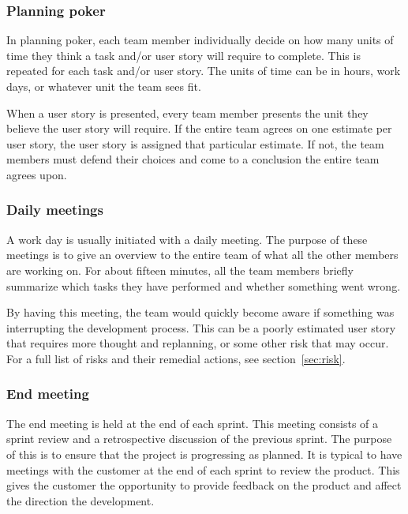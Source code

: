 \subsubsection{Planning poker}
In planning poker, each team member individually decide on how many units of time they think a task and/or user story will require to complete. This is repeated for each task and/or user story. The units of time can be in hours, work days, or whatever unit the team sees fit.

When a user story is presented, every team member presents the unit they believe the user story will require. If the entire team agrees on one estimate per user story, the user story is assigned that particular estimate. If not, the team members must defend their choices and come to a conclusion the entire team agrees upon.

\subsubsection{Daily meetings}
A work day is usually initiated with a daily meeting. The purpose of these meetings is to give an overview to the entire team of what all the other members are working on. For about fifteen minutes, all the team members briefly summarize which tasks they have performed and whether something went wrong.

By having this meeting, the team would quickly become aware if something was interrupting the development process. This can be a poorly estimated user story that requires more thought and replanning, or some other risk that may occur. For a full list of risks and their remedial actions, see section~\ref{sec:risk}. 

\subsubsection{End meeting}
The end meeting is held at the end of each sprint. This meeting consists of a sprint review and a retrospective discussion of the previous sprint. The purpose of this is to ensure that the project is progressing as planned. It is typical to have meetings with the customer at the end of each sprint to review the product. This gives the customer the opportunity to provide feedback on the product and affect the direction the development.


